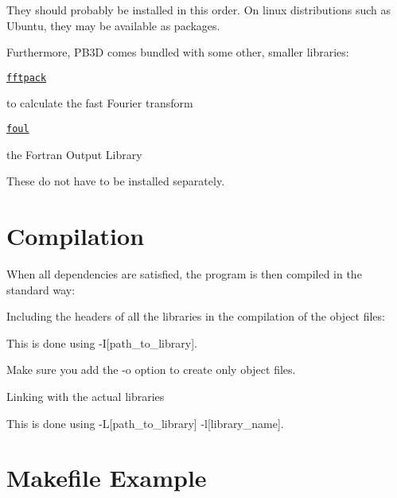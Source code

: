 They should probably be installed in this order. On linux distributions such as Ubuntu, they may be available as packages.

Furthermore, P\+B3D comes bundled with some other, smaller libraries\+:
\begin{DoxyItemize}
\item \href{http://www.netlib.org/fftpack/}{\tt fftpack}
\begin{DoxyItemize}
\item to calculate the fast Fourier transform
\end{DoxyItemize}
\item \href{http://foul.sourceforge.net/}{\tt foul}
\begin{DoxyItemize}
\item the Fortran Output Library
\end{DoxyItemize}
\end{DoxyItemize}

These do not have to be installed separately.\hypertarget{page_installation_installation_compilation}{}\section{Compilation}\label{page_installation_installation_compilation}
When all dependencies are satisfied, the program is then compiled in the standard way\+:
\begin{DoxyItemize}
\item Including the headers of all the libraries in the compilation of the object files\+:
\begin{DoxyItemize}
\item This is done using {\ttfamily -\/I\mbox{[}path\+\_\+to\+\_\+library\mbox{]}}.
\item Make sure you add the {\ttfamily -\/o} option to create only object files.
\end{DoxyItemize}
\item Linking with the actual libraries
\begin{DoxyItemize}
\item This is done using {\ttfamily -\/L\mbox{[}path\+\_\+to\+\_\+library\mbox{]} -\/l\mbox{[}library\+\_\+name\mbox{]}}.
\end{DoxyItemize}
\end{DoxyItemize}\hypertarget{page_installation_installation_makefile}{}\section{Makefile Example}\label{page_installation_installation_makefile}

